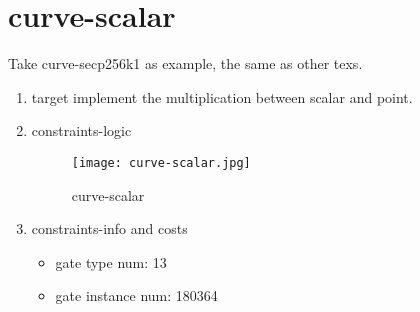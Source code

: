 \section{curve-scalar}
\label{curve-scalar}

Take curve-secp256k1 as example, the same as other texs.

\begin{enumerate}
    \item target
        implement the multiplication between scalar and point. 
    \item constraints-logic
        \begin{figure}[!ht]
            \centering
            \texttt{[image: curve-scalar.jpg]}
            \caption{curve-scalar}
            \label{fig:curve-scalar}
        \end{figure}
    
    \item constraints-info and costs
        \begin{itemize}
            \item gate type num: 13 
            \item gate instance num: 180364          
        \end{itemize}
\end{enumerate}
